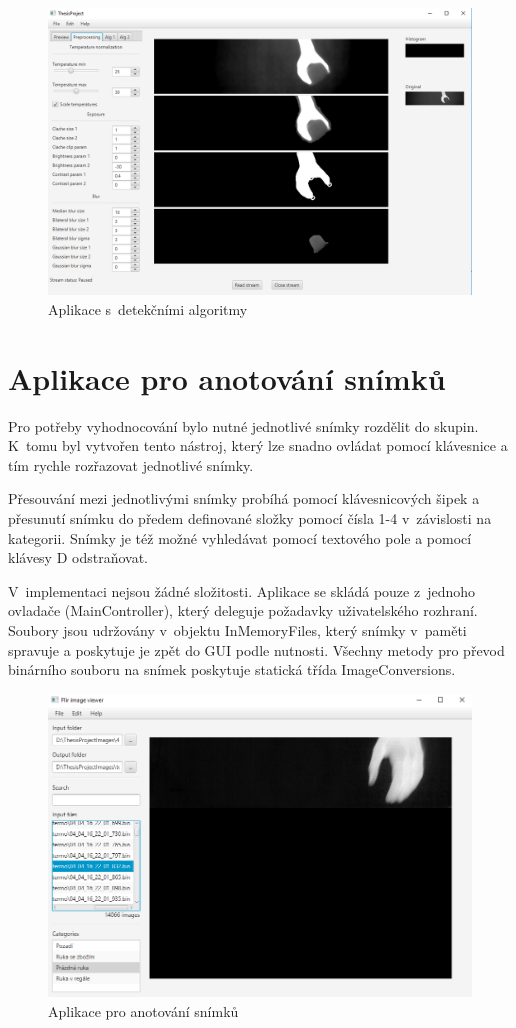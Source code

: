     \begin{figure}[h]
      \centering
      \includegraphics[width=1\textwidth]{images/main_app.png}
      \caption{Aplikace s~detekčními algoritmy}
      \label{fig:flir_binary_viewer}
    \end{figure} 
    
\clearpage

\section{Aplikace pro anotování snímků}
Pro potřeby vyhodnocování bylo nutné jednotlivé snímky rozdělit do skupin. K~tomu byl vytvořen tento nástroj, který lze snadno ovládat pomocí klávesnice a tím rychle rozřazovat jednotlivé snímky. 

Přesouvání mezi jednotlivými snímky probíhá pomocí klávesnicových šipek a přesunutí snímku do předem definované složky pomocí čísla 1-4 v~závislosti na kategorii. Snímky je též možné vyhledávat pomocí textového pole a pomocí klávesy D odstraňovat.

V~implementaci nejsou žádné složitosti. Aplikace se skládá pouze z~jednoho ovladače (MainController), který deleguje požadavky uživatelského rozhraní. Soubory jsou udržovány v~objektu InMemoryFiles, který snímky v~paměti spravuje a poskytuje je zpět do GUI podle nutnosti. Všechny metody pro převod binárního souboru na snímek poskytuje statická třída ImageConversions.

\begin{figure}[h]
  \centering
  \includegraphics[width=1\textwidth]{images/flir_binary_viewer.png}
  \caption{Aplikace pro anotování snímků}
  \label{fig:flir_binary_viewer}
\end{figure} 